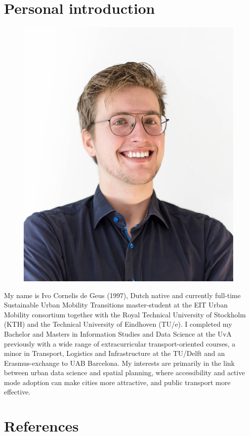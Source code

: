 \documentclass[sigconf, natbib=false, nonacm]{acmart}
\begin{document}
\section{Personal introduction}\label{section:introduction}
    \label{appendix:author_IG}
    \begin{figure}[h]
        \includegraphics[width=0.4\linewidth]{figures/low-quality.jpg}
    \end{figure}
    My name is Ivo Cornelis de Geus (1997), Dutch native and currently full-time Sustainable Urban Mobility Transitions master-student at the EIT Urban Mobility consortium together with the Royal Technical University of Stockholm (KTH) and the Technical University of Eindhoven (TU/e). I completed my Bachelor and Masters in Information Studies and Data Science at the UvA previously with a wide range of extracurricular transport-oriented courses, a minor in Transport, Logistics and Infrastructure at the TU/Delft and an Erasmus-exchange to UAB Barcelona. My interests are primarily in the link between urban data science and spatial planning, where accessibility and active mode adoption can make cities more attractive, and public transport more effective.  
    
\section{References}
\printbibliography[heading=none]
\end{document}
